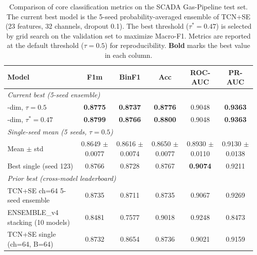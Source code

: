 
\begin{table}[htbp]
\centering
\caption{Comparison of core classification metrics on the SCADA Gas-Pipeline test set.
The current best model is the 5-seed probability-averaged ensemble of
TCN+SE (23 features, 32 channels, dropout 0.1).
The best threshold ($\tau^*=0.47$) is selected by grid search on the
validation set to maximize Macro-F1.
Metrics are reported at the default threshold ($\tau=0.5$) for reproducibility.
\textbf{Bold} marks the best value in each column.}
\label{tab:core-metrics}
\setlength{\tabcolsep}{4pt}
\renewcommand{\arraystretch}{1.05}
\footnotesize
\begin{tabular}{l c c c c c}
\hline\hline
\textbf{Model} & \textbf{F1m} & \textbf{BinF1} & \textbf{Acc} & \textbf{ROC-AUC} & \textbf{PR-AUC} \\
\hline
\multicolumn{6}{l}{\textit{Current best (5-seed ensemble)}} \\
\quad 23-dim, $\tau=0.5$              & \textbf{0.8775} & \textbf{0.8737} & \textbf{0.8776} & 0.9048 & \textbf{0.9363} \\
\quad 23-dim, $\tau^{*}=0.47$         & \textbf{0.8799} & \textbf{0.8766} & \textbf{0.8800} & 0.9048 & \textbf{0.9363} \\
\hline
\multicolumn{6}{l}{\textit{Single-seed mean (5 seeds, $\tau=0.5$)}} \\
\quad Mean $\pm$ std                  & 0.8649 $\pm$ 0.0077 & 0.8616 $\pm$ 0.0074 & 0.8650 $\pm$ 0.0077 & 0.8930 $\pm$ 0.0110 & 0.9130 $\pm$ 0.0138 \\
\quad Best single (seed 123)          & 0.8766 & 0.8728 & 0.8767 & \textbf{0.9074} & 0.9211 \\
\hline
\multicolumn{6}{l}{\textit{Prior best (cross-model leaderboard)}} \\
\quad TCN+SE ch=64 5-seed ensemble \cite{leaderboard2026}  & 0.8735 & 0.8711 & 0.8735 & 0.9067 & 0.9269 \\
\quad ENSEMBLE\_v4 stacking (10 models)                    & 0.8481 & 0.7577 & 0.9018 & 0.9248 & 0.8473 \\
\quad TCN+SE single (ch=64, B=64)                           & 0.8732 & 0.8654 & 0.8736 & 0.9021 & 0.9159 \\

\end{tabular}
\end{table}
